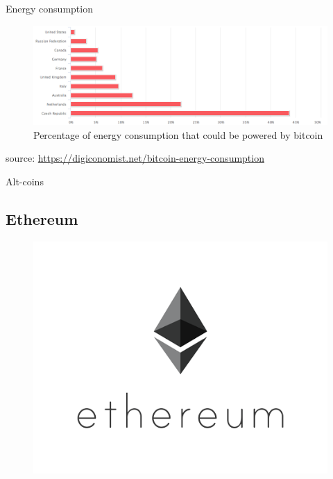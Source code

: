 \documentclass[9pt]{beamer}
\begin{document}

\begin{frame}{Energy consumption}
	\begin{figure}[]
		\centering
		\includegraphics  [scale=0.3]{Images/bitcoin-energy}
		\caption{Percentage of energy consumption that could be powered by bitcoin}
	\end{figure}
	\begin{scriptsize}
		source: \href{https://digiconomist.net/bitcoin-energy-consumption}{https://digiconomist.net/bitcoin-energy-consumption}
	\end{scriptsize}
\end{frame}



\begin{frame}
\begin{center}
\begin{large}
Alt-coins
\end{large}
\end{center}
\end{frame}

\subsection{Ethereum}

\begin{frame}
	\begin{figure}[]
		\centering
		\includegraphics  [scale=0.3]{Images/ethereum-logo}
	\end{figure}
\end{frame}
\end{document}
